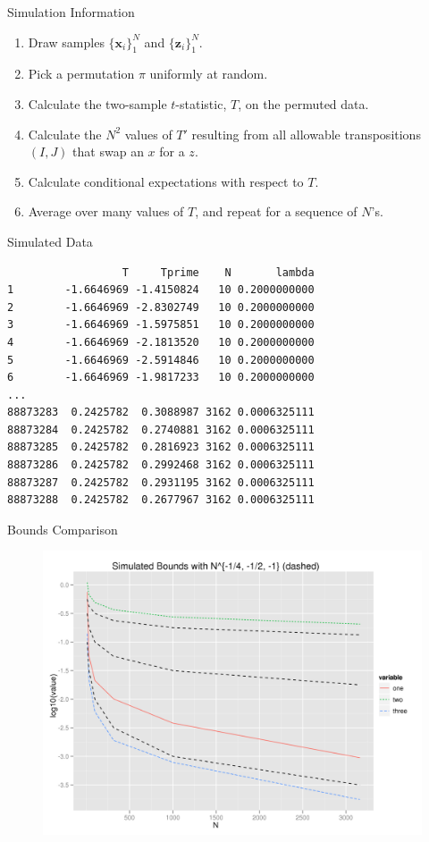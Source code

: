 \documentclass{beamer}
\begin{document}
\begin{frame}{Simulation Information}
  \begin{enumerate}
  \item Draw samples $\{\mathbf{x}_i\}_1^{N}$ and
    $\{\mathbf{z}_i\}_1^{N}$. \pause
  \item Pick a permutation $\pi$ uniformly at random. \pause
  \item Calculate the two-sample $t$-statistic, $T$, on the permuted
    data. \pause
  \item Calculate the $N^2$ values of $T'$ resulting from all
    allowable transpositions $(I, J)$ that swap an $x$ for a $z$. \pause
  \item Calculate conditional expectations with respect to $T$. \pause
  \item Average over many values of $T$, and repeat for a sequence of
    $N$'s.  
  \end{enumerate}
\end{frame}

\begin{frame}[fragile]{Simulated Data}
\begin{verbatim}
                  T     Tprime    N       lambda
1        -1.6646969 -1.4150824   10 0.2000000000
2        -1.6646969 -2.8302749   10 0.2000000000
3        -1.6646969 -1.5975851   10 0.2000000000
4        -1.6646969 -2.1813520   10 0.2000000000
5        -1.6646969 -2.5914846   10 0.2000000000
6        -1.6646969 -1.9817233   10 0.2000000000
...
88873283  0.2425782  0.3088987 3162 0.0006325111
88873284  0.2425782  0.2740881 3162 0.0006325111
88873285  0.2425782  0.2816923 3162 0.0006325111
88873286  0.2425782  0.2992468 3162 0.0006325111
88873287  0.2425782  0.2931195 3162 0.0006325111
88873288  0.2425782  0.2677967 3162 0.0006325111
\end{verbatim}
\end{frame}

\begin{frame}{Bounds Comparison}
  \begin{figure}[!ht]
   \centering
   \includegraphics[scale=.5]{boundsexact.png}
 \end{figure}
\end{frame}
\end{document}

